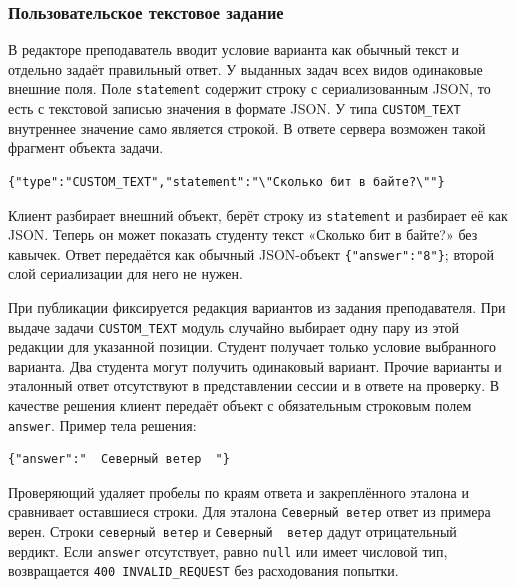 \documentclass[12pt,a4paper]{article}
\begin{document}
\subsubsection{Пользовательское текстовое задание}\label{ux43fux43eux43bux44cux437ux43eux432ux430ux442ux435ux43bux44cux441ux43aux43eux435-ux442ux435ux43aux441ux442ux43eux432ux43eux435-ux437ux430ux434ux430ux43dux438ux435}

\hypertarget{пользовательское-текстовое-задание}{}

В редакторе преподаватель вводит условие варианта как обычный текст и отдельно задаёт правильный ответ. У выданных задач всех видов одинаковые внешние поля. Поле \texttt{statement} содержит строку с сериализованным JSON, то есть с текстовой записью значения в формате JSON. У типа \texttt{CUSTOM\_\allowbreak{}TEXT} внутреннее значение само является строкой. В ответе сервера возможен такой фрагмент объекта задачи.

\begin{verbatim}
{"type":"CUSTOM_TEXT","statement":"\"Сколько бит в байте?\""}
\end{verbatim}

Клиент разбирает внешний объект, берёт строку из \texttt{statement} и разбирает её как JSON. Теперь он может показать студенту текст «Сколько бит в байте?» без кавычек. Ответ передаётся как обычный JSON-объект \texttt{\{"answer":"8"\}}; второй слой сериализации для него не нужен.

При публикации фиксируется редакция вариантов из задания преподавателя. При выдаче задачи \texttt{CUSTOM\_\allowbreak{}TEXT} модуль случайно выбирает одну пару из этой редакции для указанной позиции. Студент получает только условие выбранного варианта. Два студента могут получить одинаковый вариант. Прочие варианты и эталонный ответ отсутствуют в представлении сессии и в ответе на проверку. В качестве решения клиент передаёт объект с обязательным строковым полем \texttt{answer}. Пример тела решения:

\begin{verbatim}
{"answer":"  Северный ветер  "}
\end{verbatim}

Проверяющий удаляет пробелы по краям ответа и закреплённого эталона и сравнивает оставшиеся строки. Для эталона \texttt{Северный\ ветер} ответ из примера верен. Строки \texttt{северный\ ветер} и \texttt{Северный\ \ ветер} дадут отрицательный вердикт. Если \texttt{answer} отсутствует, равно \texttt{null} или имеет числовой тип, возвращается \texttt{400 INVALID\_\allowbreak{}REQUEST} без расходования попытки.
\end{document}
